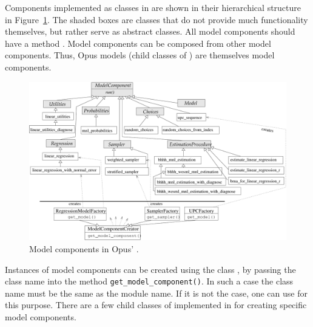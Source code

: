 Components implemented as classes in  are shown in their hierarchical
structure in Figure~\ref{fig:model-components}. The shaded boxes are classes
that do not provide much functionality themselves, but rather serve as
abstract classes. All model components should have a method .
Model components can be composed from other model components.  Thus, Opus
models (child classes of ) are themselves model components.

\begin{figure}[t]
\begin{center}
\includegraphics[scale=0.6]{images/corecomponents.pdf}
\caption{\label{fig:model-components}\small Model components in Opus' .}
\end{center}
\end{figure}

Instances of model components can be created using the class
, by passing the class name into the method
\verb|get_model_component()|. In such a case the class name must be the same
as the module name. If it is not the case, one can use 
for this purpose. There are a few child classes of
 implemented in  for creating specific
model components.

